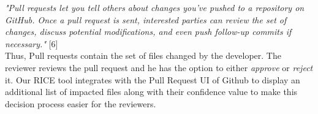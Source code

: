 \textit{"Pull requests let you tell others about changes you've pushed to a repository on GitHub. Once a pull request is sent, interested parties can review the set of changes, discuss potential modifications, and even push follow-up commits if necessary."} [6] \\

Thus, Pull requests contain the set of files changed by the developer. The reviewer reviews the pull request and he has the option to either \textit{approve} or \textit{reject} it. Our RICE tool integrates with the Pull Request UI of Github to display an additional list of impacted files along with their confidence value to make this decision process easier for the reviewers.   



